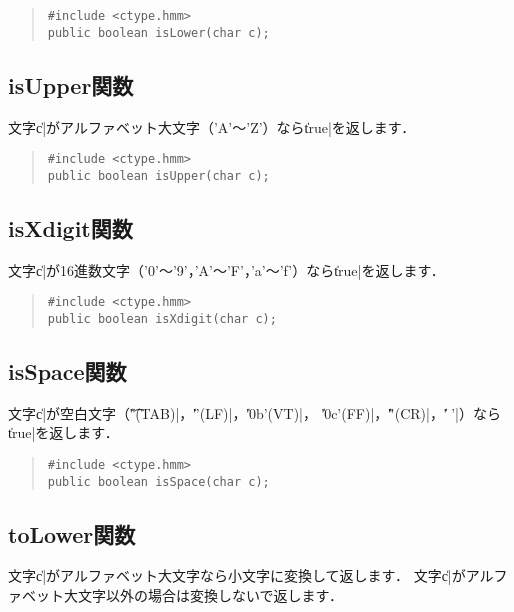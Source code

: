 \begin{quote}
\begin{verbatim}
#include <ctype.hmm>
public boolean isLower(char c);
\end{verbatim}
\end{quote}

\subsection{isUpper関数}

文字\|c|がアルファベット大文字（'A'〜'Z'）なら\|true|を返します．

\begin{quote}
\begin{verbatim}
#include <ctype.hmm>
public boolean isUpper(char c);
\end{verbatim}
\end{quote}

\subsection{isXdigit関数}

文字\|c|が16進数文字（'0'〜'9'，'A'〜'F'，'a'〜'f'）なら\|true|を返します．

\begin{quote}
\begin{verbatim}
#include <ctype.hmm>
public boolean isXdigit(char c);
\end{verbatim}
\end{quote}

\subsection{isSpace関数}

文字\|c|が空白文字（\|'\t'(TAB)|，\|'\n'(LF)|，\|'\x0b'(VT)|，
\|'\x0c'(FF)|，\|'\r'(CR)|，\|' '|）なら\|true|を返します．

\begin{quote}
\begin{verbatim}
#include <ctype.hmm>
public boolean isSpace(char c);
\end{verbatim}
\end{quote}

\subsection{toLower関数}

文字\|c|がアルファベット大文字なら小文字に変換して返します．
文字\|c|がアルファベット大文字以外の場合は変換しないで返します．

